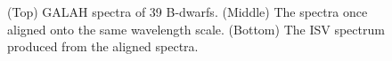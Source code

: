 \begin{figure}
    \caption{(Top) GALAH spectra of 39 B-dwarfs. (Middle) The spectra once aligned onto the same wavelength scale. (Bottom) The ISV spectrum produced from the aligned spectra.}
    \label{figGALAHbstar1}
\end{figure}
\begin{figure}
	\captionsetup{width=.8\textwidth}
    \hspace{-2cm}

\end{figure}
